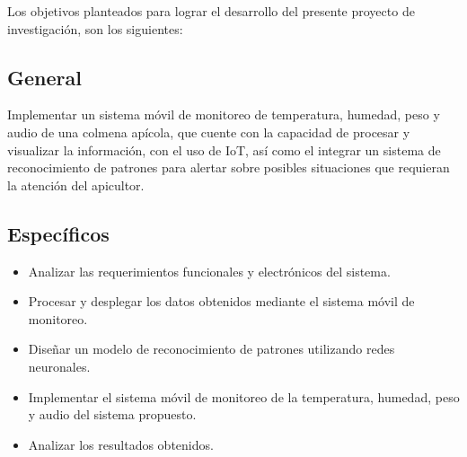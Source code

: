 Los objetivos planteados para lograr el desarrollo del presente proyecto de investigación, son los siguientes:

\subsection{General}
Implementar un sistema móvil de monitoreo de temperatura, humedad, peso y audio de una colmena apícola, que cuente con la capacidad de procesar y visualizar la información, con el uso de IoT, así como el integrar un sistema de reconocimiento de patrones para alertar sobre posibles situaciones que requieran la atención del apicultor.

\subsection{Específicos}
\begin{itemize}
    \item Analizar las requerimientos funcionales y electrónicos del sistema.
    \item Procesar y desplegar los datos obtenidos mediante el sistema móvil de monitoreo.
    \item Diseñar un modelo de reconocimiento de patrones utilizando redes neuronales.
    \item Implementar el sistema móvil de monitoreo de la temperatura, humedad, peso y audio del sistema propuesto.
    \item Analizar los resultados obtenidos.
\end{itemize}
